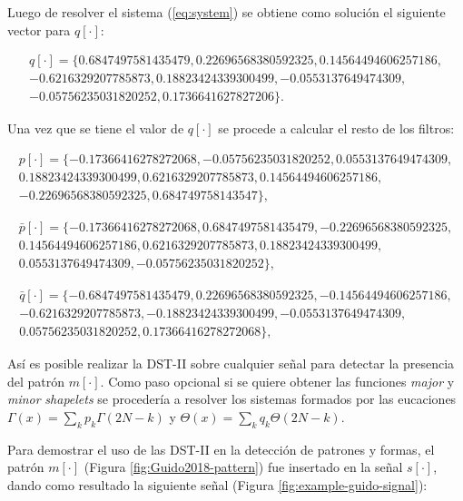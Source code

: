 Luego de resolver el sistema (\ref{eq:system}) se obtiene como solución el siguiente vector para $q[\cdot]$:

$$
	\begin{array}{lcl}
		q[\cdot] = \{ 0.6847497581435479, 0.22696568380592325, 0.14564494606257186,  \\ 
					-0.6216329207785873, 0.18823424339300499, -0.0553137649474309, \\ 
					-0.05756235031820252, 0.1736641627827206 \}.
	\end{array}
$$

Una vez que se tiene el valor de $q[\cdot]$ se procede a calcular el resto de los filtros:

$$
	\begin{array}{lcl}
		p[\cdot] = \{  -0.17366416278272068, -0.05756235031820252, 0.0553137649474309, \\ 
					0.18823424339300499, 0.6216329207785873, 0.14564494606257186, \\
					-0.22696568380592325, 0.684749758143547\},
	\end{array}
$$

$$
	\begin{array}{lcl}
		\bar p[\cdot] = \{ -0.17366416278272068, 0.6847497581435479, -0.22696568380592325, \\ 
							0.14564494606257186, 0.6216329207785873, 0.18823424339300499, \\ 
							0.0553137649474309, -0.05756235031820252 \},
	\end{array}
$$

$$
	\begin{array}{lcl}
		\bar q[\cdot] = \{ -0.6847497581435479, 0.22696568380592325, -0.14564494606257186,\\
			-0.6216329207785873, -0.18823424339300499, -0.0553137649474309, \\ 
		0.05756235031820252, 0.17366416278272068 \},
	\end{array}
$$

Así es posible realizar la DST-II sobre cualquier señal para detectar la presencia
del patrón $m[\cdot]$. Como paso opcional si se quiere obtener las funciones \textit{major} y \textit{minor}
\textit{shapelets} se procedería a resolver los sistemas formados por las eucaciones  $\Gamma(x)=\sum_k p_k \Gamma(2N-k)$ y 
$\Theta(x)=\sum_k q_k \Theta(2N-k)$.

Para demostrar el uso de las DST-II en la detección de patrones y formas, el patrón $m[\cdot]$ (Figura \ref{fig:Guido2018-pattern}) 
fue insertado en la señal $s[\cdot]$, dando como resultado la siguiente señal (Figura \ref{fig:example-guido-signal}):

